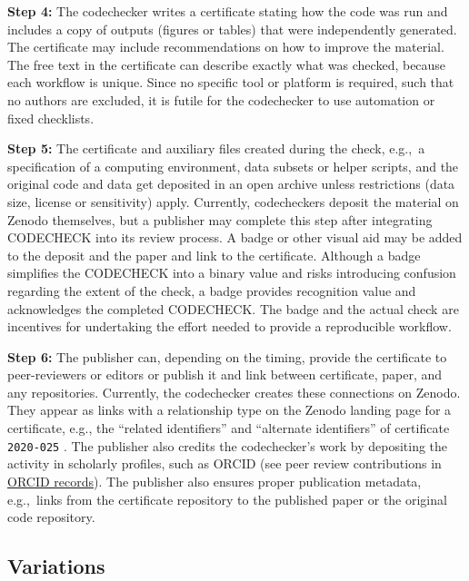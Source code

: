 \documentclass[12pt]{article}
\begin{document}
\textbf{Step 4:} The codechecker writes a certificate stating how the
code was run and includes a copy of outputs (figures or tables) that
were independently generated.  The certificate may include
recommendations on how to improve the material.  The free text in the
certificate can describe exactly what was checked, because each
workflow is unique.  Since no specific tool or platform is required,
such that no authors are excluded, it is futile for the
codechecker to use automation or fixed checklists.

\textbf{Step 5:} The certificate and auxiliary files created during
the check, e.g.,~a specification of a computing environment, data
subsets or helper scripts, and the original code and data get
deposited in an open archive unless restrictions (data size, license
or sensitivity) apply.  Currently, codecheckers deposit the material
on Zenodo themselves, but a publisher may complete this step after
integrating CODECHECK into its review process.  A badge or other
visual aid may be added to the deposit and the paper and link to the
certificate.  Although a badge simplifies the CODECHECK into a binary
value and risks introducing confusion regarding the extent of the
check, a badge provides recognition value and acknowledges the
completed CODECHECK.  The badge and the actual check are incentives
for undertaking the effort needed to provide a reproducible workflow.

\textbf{Step 6:} The publisher can, depending on the timing, provide
the certificate to peer-reviewers or editors or publish it and link
between certificate, paper, and any repositories. Currently, the
codechecker creates these connections on Zenodo. They appear as links
with a relationship type on the Zenodo landing page for a certificate,
e.g., the ``related identifiers'' and ``alternate identifiers'' of
certificate \texttt{2020-025} \cite{cert-2020-025}.  The publisher
also credits the codechecker's work by depositing the activity
in scholarly profiles, such as ORCID (see peer review contributions in
\href{https://support.orcid.org/hc/en-us/articles/360006971333-Peer-Review}{ORCID records}).
The publisher also ensures proper publication metadata, e.g.,~links
from the certificate repository to the published paper or the original
code repository.

\subsection*{Variations}\label{variations}
\end{document}
